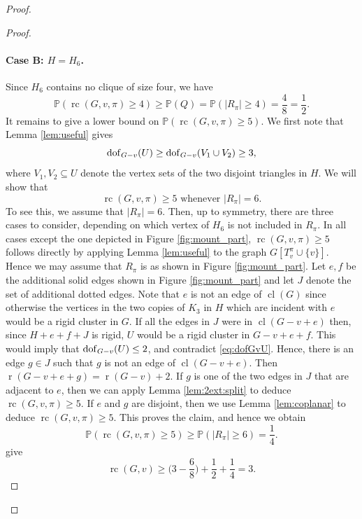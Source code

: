 \documentclass[11pt,a4paper]{article}
\theoremstyle{definition}
\DeclareMathOperator{\rr}{r}
\DeclareMathOperator{\rc}{rc}
\DeclareMathOperator{\cl}{cl}
\newcommand{\dof}{{\rm dof}}
\newcommand{\Prob}{\mathbb{P}}
\begin{document}
\begin{proof}
\begin{proof}
    \paragraph{\boldmath Case B: $H={{H}}_6$.}
    Since $H_6$ contains no clique of size four, we have
    \begin{equation}\label{eq:caseb1}
        \Prob(\rc(G,v,\pi)\geq 4)\geq \Prob(Q)=\Prob(|R_\pi|\geq 4) =\frac{4}{8}=\frac{1}{2}.
    \end{equation}
    It remains to give a lower bound on $\Prob(\rc(G,v,\pi)\geq 5)$. 
    We first note that Lemma \ref{lem:useful} gives 
    \begin{equation}\label{eq:dofGvU}
        \dof_{G-v}(U)\geq \dof_{G-v}(V_1\cup V_2)\geq 3,
    \end{equation}
    where $V_1,V_2\subseteq U$ denote the vertex sets of the two disjoint triangles in $H$.
    We will show that
    \begin{equation}\label{eq:tizenegy}
     \mbox{$\rc(G,v,\pi)\geq 5$ whenever $|R_\pi|=6$.}
     \end{equation}
    To see this, we assume that $|R_\pi|=6$. Then, up to symmetry, there are three cases to consider,
    depending on which vertex of ${{H}}_6$ is not included in $R_\pi$. In all cases except the one depicted in Figure \ref{fig:mount_part}, $\rc(G,v,\pi)\geq 5$ follows directly 
    by applying Lemma \ref{lem:useful} to the graph $G[T_v^\pi\cup \{v\}]$. Hence we may assume that $R_\pi$ is as shown in Figure \ref{fig:mount_part}. Let 
    $e,f$ be the additional solid edges shown in Figure \ref{fig:mount_part} and let $J$ denote the set of additional dotted edges.
    Note that $e$ is not an edge of $\cl(G)$ since otherwise the vertices in the two copies of $K_3$ in $H$ which are incident with $e$ would be a rigid cluster in $G$.
    If all the edges in $ J$ were in $\cl(G-v+e)$ then, since
    $H+e+f+J$ is rigid, $U$ would be a rigid cluster in $G-v+e+f$. This would imply that $\dof_{G-v}(U)\leq 2$, and contradict \eqref{eq:dofGvU}.
    Hence, there is an edge $g\in J$ such that $g$ is not an edge of $\cl(G-v+e)$. Then  $\rr(G-v+e+g)=\rr(G-v)+2$.
    If $g$ is one of the two edges in $J$ that are adjacent to $e$, then we can apply Lemma \ref{lem:2ext:split} to deduce $\rc(G,v,\pi)\geq 5$. If $e$ and $g$ are disjoint, then we use Lemma \ref{lem:coplanar} to deduce $\rc(G,v,\pi)\geq 5$.
    This proves the claim, and hence we obtain 
    \begin{equation}\label{eq:caseb2}
        \Prob(\rc(G,v,\pi)\geq 5)\geq \Prob(|R_\pi|\geq 6)=\frac{1}{4}.
    \end{equation}
     give
    $$\rc(G,v)\geq \Big(3-\frac{6}{8}\Big)+\frac{1}{2}+\frac{1}{4}= 3.$$
    

\end{proof}
\end{proof}
\end{document}
